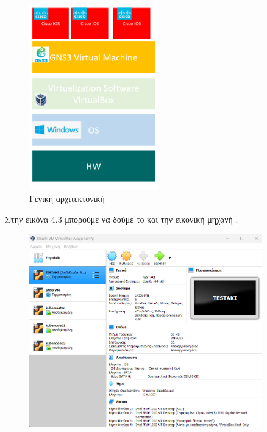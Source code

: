 \begin{figure}[htb]
	\centering
	\includegraphics[width=0.5\textwidth]{graphics/virtualization_architecture.PNG}
	\caption{ Γενική αρχιτεκτονική}
\end{figure}

Στην εικόνα 4.3 μπορούμε να δούμε το  και την εικονική μηχανή .

\begin{figure}[htb]
	\centering
	\includegraphics[width=0.9\textwidth]{graphics/virtualbox.PNG}
	\caption{ }
\end{figure}






